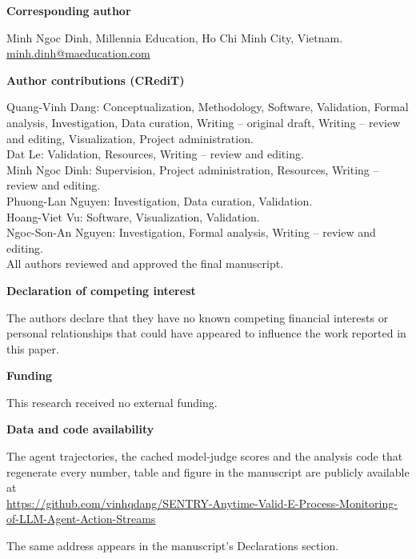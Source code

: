 \documentclass[11pt]{article}
\begin{document}
\vspace{1em}
\noindent\textbf{Corresponding author}

\vspace{0.4em}
\noindent
Minh Ngoc Dinh, Millennia Education, Ho Chi Minh City, Vietnam.\\
\href{mailto:minh.dinh@maeducation.com}{minh.dinh@maeducation.com}

\vspace{1em}
\noindent\textbf{Author contributions (CRediT)}

\vspace{0.4em}
\noindent
Quang-Vinh Dang: Conceptualization, Methodology, Software, Validation, Formal
analysis, Investigation, Data curation, Writing -- original draft, Writing --
review and editing, Visualization, Project administration.\\
Dat Le: Validation, Resources, Writing -- review and editing.\\
Minh Ngoc Dinh: Supervision, Project administration, Resources, Writing -- review and editing.\\
Phuong-Lan Nguyen: Investigation, Data curation, Validation.\\
Hoang-Viet Vu: Software, Visualization, Validation.\\
Ngoc-Son-An Nguyen: Investigation, Formal analysis, Writing -- review and editing.\\
All authors reviewed and approved the final manuscript.

\vspace{1em}
\noindent\textbf{Declaration of competing interest}

\vspace{0.4em}
\noindent
The authors declare that they have no known competing financial interests or
personal relationships that could have appeared to influence the work reported in
this paper.

\vspace{1em}
\noindent\textbf{Funding}

\vspace{0.4em}
\noindent
This research received no external funding.

\vspace{1em}
\noindent\textbf{Data and code availability}

\vspace{0.4em}
\noindent
The agent trajectories, the cached model-judge scores and the analysis code that
regenerate every number, table and figure in the manuscript are publicly
available at\\
\url{https://github.com/vinhqdang/SENTRY-Anytime-Valid-E-Process-Monitoring-of-LLM-Agent-Action-Streams}

\noindent
The same address appears in the manuscript's Declarations section.
\end{document}
